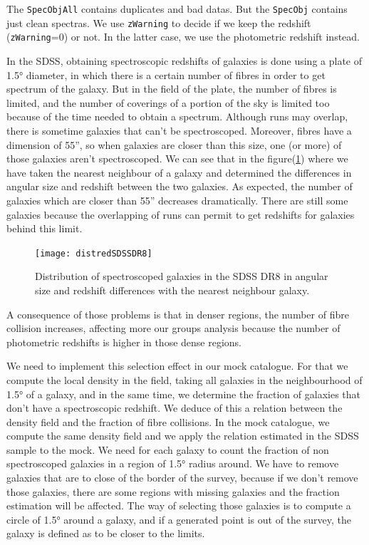 The \texttt{SpecObjAll} contains duplicates and bad datas. But the \texttt{SpecObj} contains just clean spectras. We use
\texttt{zWarning} to decide if we keep the redshift (\texttt{zWarning}=0) or not. In the latter case, we use the photometric
redshift instead.

In the SDSS, obtaining spectroscopic redshifts of galaxies is done using a plate of \num{1.5}° diameter, in which there is a certain
number of fibres in order to get spectrum of the galaxy. But in the field of the plate, the number of fibres is limited, and the
number of coverings of a portion of the sky is limited too because of the time needed to obtain a spectrum. Although runs may
overlap, there is sometime galaxies that can't be spectroscoped. Moreover, fibres have a dimension of \num{55}'', so when galaxies
are closer than this size, one (or more) of those galaxies aren't spectroscoped. We can see that in the figure(\ref{fig:angreddist})
where we have taken the nearest neighbour of a galaxy and determined the differences in angular size and redshift between the two
galaxies. As expected, the number of galaxies which are closer than \num{55}'' decreases dramatically. There are still some galaxies
because the overlapping of runs can permit to get redshifts for galaxies behind this limit.
\begin{figure}[ht]
	\centering
	\texttt{[image: distredSDSSDR8]}
	\caption{\footnotesize{}Distribution of spectroscoped galaxies in the SDSS DR8 in angular size and redshift differences with
	the nearest neighbour galaxy.}
	\label{fig:angreddist}
\end{figure}

A consequence of those problems is that in denser regions, the number of fibre collision increases, affecting more our groups
analysis because the number of photometric redshifts is higher in those dense regions.

We need to implement this selection effect in our mock catalogue. For that we compute the local density in the field, taking all
galaxies in the neighbourhood of \num{1.5}° of a galaxy, and in the same time, we determine the fraction of galaxies that don't have
a spectroscopic redshift. We deduce of this a relation between the density field and the fraction of fibre collisions. In the mock
catalogue, we compute the same density field and we apply the relation estimated in the SDSS sample to the mock. We
need for each galaxy to count the fraction of non spectroscoped galaxies in a region of \num{1.5}° radius around. We have to remove
galaxies that are to close of the border of the survey, because if we don't remove those galaxies, there are some regions with
missing galaxies and the fraction estimation will be affected. The way of selecting those galaxies is to compute a circle of
\num{1.5}° around a galaxy, and if a generated point is out of the survey, the galaxy is defined as to be closer to the limits.

